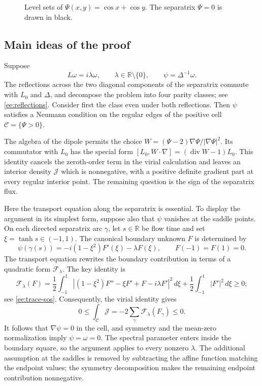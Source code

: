 \documentclass[reqno,11pt]{amsart}
\numberwithin{equation}{section}
\theoremstyle{remark}
\newcommand{\R}{\mathbb R}
\begin{document}
\begin{figure}[t]
\caption{Level sets of $\Psi(x,y)=\cos x+\cos y$. The separatrix $\Psi=0$ is drawn in black.}
\label{fig:stream-function}
\end{figure}

\subsection{Main ideas of the proof}
Suppose
\[
 L\omega=i\lambda\omega,\qquad
 \lambda\in\R\setminus\{0\},\qquad
 \psi=\Delta^{-1}\omega.
\]
The reflections across the two diagonal components of the
separatrix commute with $L_0$ and $\Delta$, and decompose the
problem into four parity classes; see \eqref{ee:reflections}.
Consider first the class even under both reflections.
Then $\psi$ satisfies a Neumann condition on the regular
edges of the positive cell $\mathcal C=\{\Psi>0\}$.

The algebra of the dipole permits the choice
$W=(\Psi-2)\nabla\Psi/|\nabla\Psi|^2$.
Its commutator with $L_0$ has the special form
$[L_0,W\cdot\nabla]=(\operatorname{div}W-1)L_0$.
This identity cancels the zeroth-order term in the virial
calculation and leaves an interior density $\mathcal J$
which is nonnegative, with a positive definite gradient
part at every regular interior point.
The remaining question is the sign of the separatrix flux.

Here the transport equation along the separatrix is essential.
To display the argument in its simplest form, suppose also
that $\psi$ vanishes at the saddle points.
On each directed separatrix arc $\gamma$, let $s\in\R$
be flow time and set $\xi=\tanh s\in(-1,1)$.
The canonical boundary unknown $F$ is determined by
\[
 \psi(\gamma(s))
 =-i(1-\xi^2)F'(\xi)-\lambda F(\xi),
 \qquad F(-1)=F(1)=0.
\]
The transport equation rewrites the boundary contribution
in terms of a quadratic form $\mathcal F_\lambda$.
The key identity is
\[
 \mathcal F_\lambda(F)
 =\frac12\int_{-1}^{1}
 \left|(1-\xi^2)F''-\xi F'+F-i\lambda F'\right|^2\,d\xi
 +\frac12\int_{-1}^{1}|F'|^2\,d\xi
 \ge0;
\]
see \eqref{ee:trace-sos}.
Consequently, the virial identity gives
\[
 0\le\int_{\mathcal C}\mathcal J
 =-2\sum_\gamma\mathcal F_\lambda(F_\gamma)\le0.
\]
It follows that $\nabla\psi=0$ in the cell, and symmetry
and the mean-zero normalization imply $\psi=\omega=0$.
The spectral parameter enters inside the boundary square,
so the argument applies to every nonzero $\lambda$.
The additional assumption at the saddles is removed by
subtracting the affine function matching the endpoint
values; the symmetry decomposition makes the remaining
endpoint contribution nonnegative.
\end{document}
